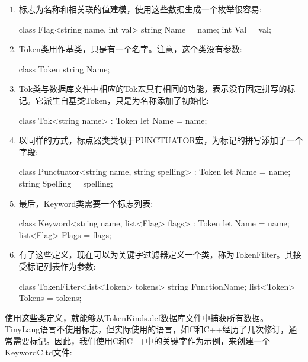 \begin{enumerate}
\item
标志为名称和相关联的值建模，使用这些数据生成一个枚举很容易:

\begin{shell}
class Flag<string name, int val> {
    string Name = name;
    int Val = val;
}
\end{shell}

\item
Token类用作基类，只是有一个名字。注意，这个类没有参数:

\begin{shell}
class Token {
    string Name;
}
\end{shell}

\item
Tok类与数据库文件中相应的Tok宏具有相同的功能，表示没有固定拼写的标记。它派生自基类Token，只是为名称添加了初始化:

\begin{shell}
class Tok<string name> : Token {
    let Name = name;
}
\end{shell}

\item
以同样的方式，标点器类类似于PUNCTUATOR宏，为标记的拼写添加了一个字段:

\begin{shell}
class Punctuator<string name, string spelling> : Token {
    let Name = name;
    string Spelling = spelling;
}
\end{shell}

\item
最后，Keyword类需要一个标志列表:

\begin{shell}
class Keyword<string name, list<Flag> flags> : Token {
    let Name = name;
    list<Flag> Flags = flags;
}
\end{shell}

\item
有了这些定义，现在可以为关键字过滤器定义一个类，称为TokenFilter。其接受标记列表作为参数:

\begin{shell}
class TokenFilter<list<Token> tokens> {
    string FunctionName;
    list<Token> Tokens = tokens;
}
\end{shell}
\end{enumerate}

使用这些类定义，就能够从TokenKinds.def数据库文件中捕获所有数据。TinyLang语言不使用标志，但实际使用的语言，如C和C++经历了几次修订，通常需要标记。因此，我们使用C和C++中的关键字作为示例，来创建一个KeywordC.td文件:

